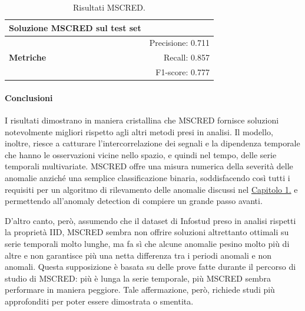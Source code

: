 \begin{table}[H]
    \centering
    \caption{Risultati MSCRED.}
    \begin{tabular}{lr}
    \toprule
    \textbf{Soluzione MSCRED sul test set}  \\
    \midrule
    \multirow{3}{*}{\textbf{Metriche}} & Precisione: 0.711 \\
    & Recall: 0.857 \\
    & F1-score: 0.777 \\
    \bottomrule
    \end{tabular}
    \label{tab:mscred-metrics}
\end{table}

\paragraph{Conclusioni} I risultati dimostrano in maniera cristallina che MSCRED fornisce
soluzioni notevolmente migliori rispetto agli altri metodi presi in analisi.
Il modello, inoltre, riesce a catturare l'intercorrelazione dei segnali e la dipendenza temporale che
hanno le osservazioni vicine nello spazio, e quindi nel tempo, delle serie temporali multivariate.
MSCRED offre una misura numerica della severità delle anomalie anziché una semplice classificazione binaria, 
soddisfacendo così tutti i requisiti per un algoritmo di rilevamento delle anomalie discussi nel 
\hyperref[cap:intro]{Capitolo 1.} e permettendo all'anomaly detection di compiere un grande passo avanti. 

D'altro canto, però, assumendo che il dataset di Infostud preso in analisi rispetti 
la proprietà IID, MSCRED sembra non offrire soluzioni altrettanto ottimali su serie temporali molto lunghe, ma fa sì che alcune anomalie pesino 
molto più di altre e non garantisce più una netta differenza tra i periodi anomali e non anomali. Questa supposizione 
è basata su delle prove fatte durante il percorso di studio di MSCRED: più è lunga la serie temporale, più 
MSCRED sembra performare in maniera peggiore. Tale affermazione, però, richiede studi più approfonditi per poter 
essere dimostrata o smentita.